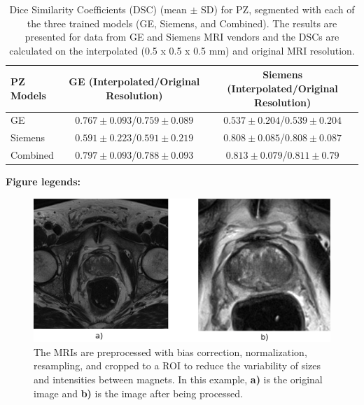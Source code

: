 \newpage
\begin{table}[ht]
     \caption{Dice Similarity Coefficients (DSC) (mean $\pm$ SD) for PZ, segmented with each of the three trained models (GE, Siemens, and Combined). The results are presented for data from GE and Siemens MRI vendors and the DSCs are calculated on the interpolated (0.5 x 0.5 x 0.5 mm) and original MRI resolution.}
    \begin{tabular}{lcc}
         \hline
            \textbf{PZ Models} & \textbf{GE (Interpolated/Original Resolution)} & \textbf{Siemens (Interpolated/Original Resolution)}\\
         \hline
         GE  & $0.767\pm0.093$/$0.759\pm0.089$ & $0.537\pm0.204$/$0.539\pm0.204$ \\
         \hline
         Siemens  & $0.591\pm0.223$/$0.591\pm0.219$ & $0.808\pm0.085$/$0.808\pm0.087$ \\
         \hline
         Combined & $\mathbf{0.797\pm0.093}$/$0.788\pm0.093$ & $\mathbf{0.813\pm0.079}$/$0.811\pm0.79$\\
         \hline
    \end{tabular}
    \label{tab:res_pz}
\end{table}

\newpage
\textbf{Figure legends:}
\begin{figure}[ht]
    \centering
    \includegraphics[totalheight=.25\textheight]{figures/Figure1.eps}
    \caption{The MRIs are preprocessed with bias correction, normalization, resampling, and cropped to a ROI to reduce the variability of sizes and intensities between magnets. In this example, \textbf{a)} is the original image and \textbf{b)} is the image after being processed.} 
    \label{fig_1}
\end{figure}

